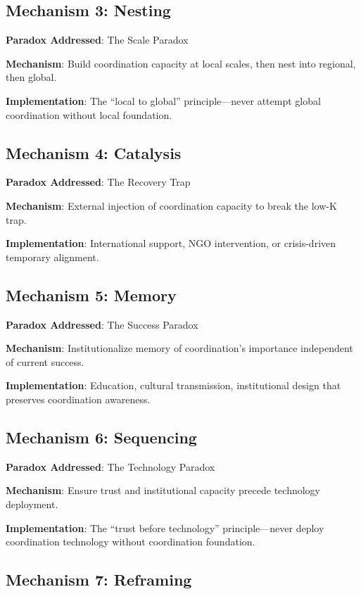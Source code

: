 \documentclass[12pt,letterpaper]{article}
\begin{document}
\subsection{Mechanism 3: Nesting}

\textbf{Paradox Addressed}: The Scale Paradox

\textbf{Mechanism}: Build coordination capacity at local scales, then nest into regional, then global.

\textbf{Implementation}: The ``local to global'' principle---never attempt global coordination without local foundation.

\subsection{Mechanism 4: Catalysis}

\textbf{Paradox Addressed}: The Recovery Trap

\textbf{Mechanism}: External injection of coordination capacity to break the low-K trap.

\textbf{Implementation}: International support, NGO intervention, or crisis-driven temporary alignment.

\subsection{Mechanism 5: Memory}

\textbf{Paradox Addressed}: The Success Paradox

\textbf{Mechanism}: Institutionalize memory of coordination's importance independent of current success.

\textbf{Implementation}: Education, cultural transmission, institutional design that preserves coordination awareness.

\subsection{Mechanism 6: Sequencing}

\textbf{Paradox Addressed}: The Technology Paradox

\textbf{Mechanism}: Ensure trust and institutional capacity precede technology deployment.

\textbf{Implementation}: The ``trust before technology'' principle---never deploy coordination technology without coordination foundation.

\subsection{Mechanism 7: Reframing}
\end{document}
